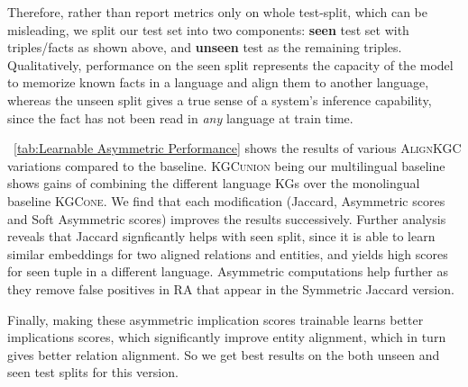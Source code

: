 \documentclass[11pt]{article}
\def\KbcOne{\textsc{KGC\-one}}
\def\KbcUnion{\textsc{KGC\-union}}
\def\shortname{\textsc{Align\-KGC}}
\begin{document}
Therefore, rather than report metrics only on whole test-split, which can be misleading, we split our test set into two components: \textbf{seen} test set with triples/facts as shown above, and \textbf{unseen} test as the remaining triples. Qualitatively, performance on the seen split represents the capacity of the model to memorize known facts in a language and align them to another language, whereas the unseen split gives a true sense of a system's inference capability, since the fact has not been read in \emph{any} language at train time.

\tablename~\ref{tab:Learnable Asymmetric Performance} shows the results of various \shortname{} variations compared to the baseline. \KbcUnion{} being our multilingual baseline shows gains of combining the different language KGs over the monolingual baseline \KbcOne{}. We find that each modification (Jaccard, Asymmetric scores and Soft Asymmetric scores) improves the results successively. Further analysis reveals that Jaccard signficantly helps with seen split, since it is able to learn similar embeddings for two aligned relations and entities, and yields high scores for seen tuple in a different language. Asymmetric computations help further as they remove false positives in RA that appear in the Symmetric Jaccard version. 



Finally, making these asymmetric implication scores trainable learns better implications scores, which significantly improve entity alignment, which in turn gives better relation alignment. So we get best results on the both unseen and seen test splits for this version.
      
\end{document}
